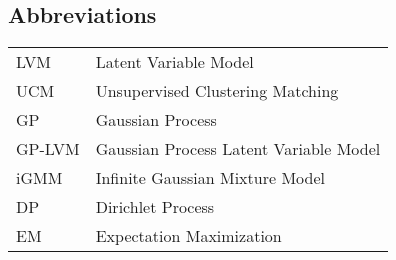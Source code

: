 \subsection*{Abbreviations}
\begin{tabular}{m{2cm}m{12cm}}
	LVM & Latent Variable Model\\
	UCM & Unsupervised Clustering Matching\\
	GP & Gaussian Process\\
	GP-LVM & Gaussian Process Latent Variable Model \\
	iGMM & Infinite Gaussian Mixture Model\\
	DP & Dirichlet Process\\
	EM & Expectation Maximization\\
\end{tabular}


\outbpdocument{}


